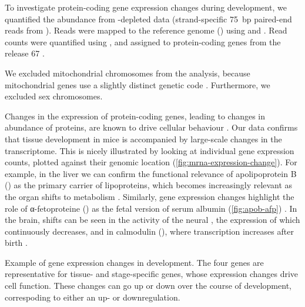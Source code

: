 To investigate protein-coding gene expression changes during development, we
quantified the \mrna abundance from \rrna-depleted \rnaseq data (strand-specific
\SI{75}{bp} paired-end reads from  ). Reads were
mapped to the \mmu reference genome () using
 \citep{Fonseca:2014} and 
\citep{Kim:2013}. Read counts were quantified using 
\citep{Anders:2014}, and assigned to protein-coding genes from the
 release \num{67} \citep{Flicek:2014}.

We excluded mitochondrial chromosomes from the analysis, because mitochondrial
genes use a slightly distinct genetic code \citep{Osawa:1989}. Furthermore, we
excluded sex chromosomes.

Changes in the expression of protein-coding genes, leading to changes in
abundance of proteins, are known to drive cellular behaviour
\citep{Brawand:2011}. Our data confirms that tissue development in mice is
accompanied by large-scale changes in the \mrna transcriptome. This is nicely
illustrated by looking at individual gene expression counts, plotted against
their genomic location (\cref{fig:mrna-expression-change}). For example, in the
liver we can confirm the functional relevance of apolipoprotein B
() as the primary carrier of lipoproteins, which becomes
increasingly relevant as the organ shifts to metabolism \citep{Knott:1986}.
Similarly, \mrna gene expression changes highlight the role of α-fetoproteine
() as the fetal version of serum albumin (\cref{fig:apob-afp})
\citep{Chen:1997}. In the brain, shifts can be seen in the activity of the
neural \tf {}, the expression of which continuously decreases, and
in calmodulin (), where transcription increases after birth
\citep{Tsui:2013,Huang:2011}.

    {Example of gene expression changes in development.}
    {The four genes are representative for tissue- and stage-specific genes,
    whose expression changes drive cell function. These changes can go up or
    down over the course of development, correspoding to either an up- or
    downregulation.}

